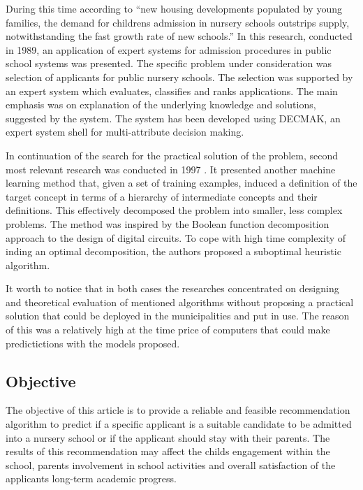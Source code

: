 During this time according to \citep{olave1989application} ``new housing
developments populated by young families, the demand for childrens
admission in nursery schools outstrips supply, notwithstanding the fast
growth rate of new schools.'' In this research, conducted in 1989, an
application of expert systems for admission procedures in public school
systems was presented. The specific problem under consideration was
selection of applicants for public nursery schools. The selection was
supported by an expert system which evaluates, classifies and ranks
applications. The main emphasis was on explanation of the underlying
knowledge and solutions, suggested by the system. The system has been
developed using DECMAK, an expert system shell for multi-attribute
decision making.

In continuation of the search for the practical solution of the problem,
second most relevant research was conducted in 1997
\citep{zupan1997machine}. It presented another machine learning method
that, given a set of training examples, induced a definition of the
target concept in terms of a hierarchy of intermediate concepts and
their definitions. This effectively decomposed the problem into smaller,
less complex problems. The method was inspired by the Boolean function
decomposition approach to the design of digital circuits. To cope with
high time complexity of inding an optimal decomposition, the authors
proposed a suboptimal heuristic algorithm.

It worth to notice that in both cases the researches concentrated on
designing and theoretical evaluation of mentioned algorithms without
proposing a practical solution that could be deployed in the
municipalities and put in use. The reason of this was a relatively high
at the time price of computers that could make predictictions with the
models proposed.

\hypertarget{objective}{%
\subsection{Objective}\label{objective}}

The objective of this article is to provide a reliable and feasible
recommendation algorithm to predict if a specific applicant is a
suitable candidate to be admitted into a nursery school or if the
applicant should stay with their parents. The results of this
recommendation may affect the childs engagement within the school,
parents involvement in school activities and overall satisfaction of the
applicants long-term academic progress.

